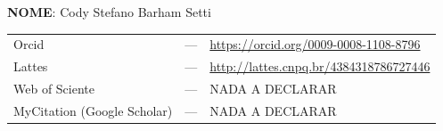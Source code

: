 \textbf{\sffamily NOME}: Cody Stefano Barham Setti

\begin{center}
	\centering
	\begin{tabular}{lcl}
		Orcid                       & --- & \url{https://orcid.org/0009-0008-1108-8796}  \\
		Lattes                      & ---  & \url{http://lattes.cnpq.br/4384318786727446} \\
		Web of Sciente              & ---  & NADA A DECLARAR \\
		MyCitation (Google Scholar) & ---  & NADA A DECLARAR \\
	\end{tabular}
\end{center}
